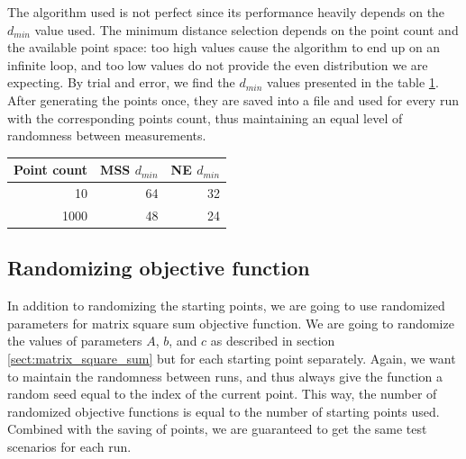 \documentclass[english, 12pt, a4paper, sci, utf8, a-1b, online, table]{aaltothesis}
\begin{document}
The algorithm used is not perfect since its performance heavily depends on the $d_{min}$ value used. The minimum distance selection depends on the point count and the available point space: too high values cause the algorithm to end up on an infinite loop, and too low values do not provide the even distribution we are expecting. By trial and error, we find the $d_{min}$ values presented in the table \ref{tab:dmin_values}. After generating the points once, they are saved into a file and used for every run with the corresponding points count, thus maintaining an equal level of randomness between measurements.

\begin{table}[H]
\centering
{}
\label{tab:dmin_values}
\begin{tabular}{|r|r|r|}
\hline
\rowcolor[HTML]{C0C0C0} 
Point count                       & MSS $d_{min}$ & NE $d_{min}$ \\ \hline
\cellcolor[HTML]{EFEFEF}10   & 64           & 32          \\ \hline
\cellcolor[HTML]{EFEFEF}1000 & 48           & 24          \\ \hline
\end{tabular}
\end{table}


\subsection{Randomizing objective function}


In addition to randomizing the starting points, we are going to use randomized parameters for matrix square sum objective function. We are going to randomize the values of parameters $A$, $b$, and $c$ as described in section \ref{sect:matrix_square_sum} but for each starting point separately. Again, we want to maintain the randomness between runs, and thus always give the function a random seed equal to the index of the current point. This way, the number of randomized objective functions is equal to the number of starting points used. Combined with the saving of points, we are guaranteed to get the same test scenarios for each run.

\end{document}
